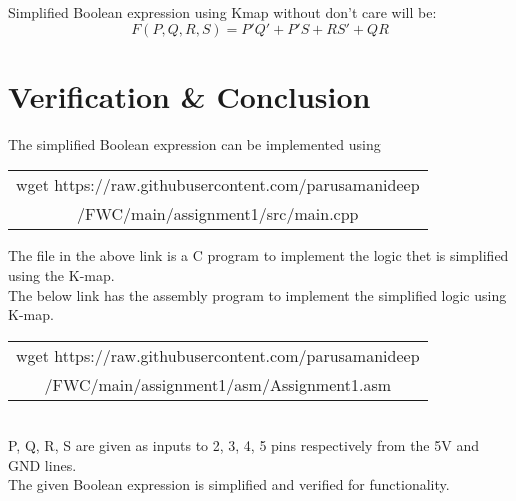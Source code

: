\documentclass[journal,12pt,twocolumn]{IEEEtran}
\begin{document}
Simplified Boolean expression using Kmap without don't care will be:
$$F(P,Q,R,S) = P'Q' + P'S + RS' + QR$$

\section{Verification \& Conclusion}
The simplified Boolean expression can be implemented using 

\vspace{10pt}
\begin{tabular}{|c|}
    \hline
wget https://raw.githubusercontent.com/parusamanideep
\\/FWC/main/assignment1/src/main.cpp
     \\ \hline
\end{tabular}

\vspace{4pt}
The file in the above link is a C program to implement the logic thet is simplified using the K-map.
\\ The below link has the assembly program to implement the simplified logic using K-map.

\vspace{10pt}
\begin{tabular}{|c|}
    \hline
wget https://raw.githubusercontent.com/parusamanideep
\\/FWC/main/assignment1/asm/Assignment1.asm
     \\ \hline
\end{tabular}
\bigskip
\\ P, Q, R, S are given as inputs to 2, 3, 4, 5 pins respectively from the 5V and GND lines.
\\The given Boolean expression is simplified and verified for functionality.
\end{document}
